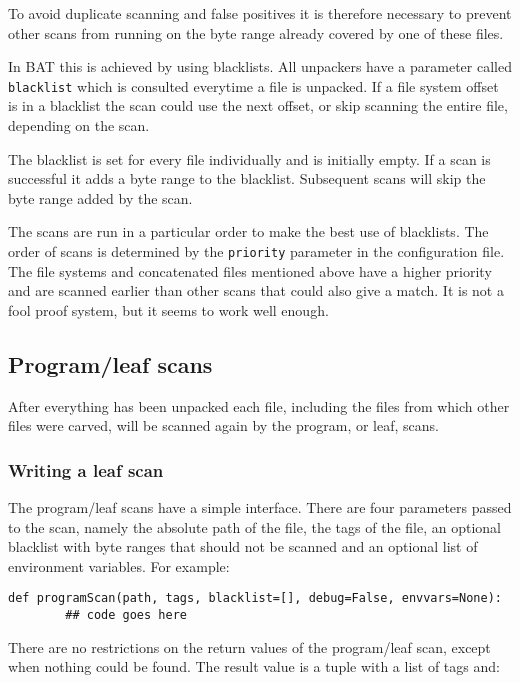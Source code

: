 \documentclass[10pt]{article}
\begin{document}
To avoid duplicate scanning and false positives it is therefore necessary to
prevent other scans from running on the byte range already covered by one of
these files.

In BAT this is achieved by using blacklists. All unpackers have a parameter
called \texttt{blacklist} which is consulted everytime a file is unpacked. If
a file system offset is in a blacklist the scan could use the next offset, or
skip scanning the entire file, depending on the scan.

The blacklist is set for every file individually and is initially empty. If a
scan is successful it adds a byte range to the blacklist. Subsequent scans
will skip the byte range added by the scan.

The scans are run in a particular order to make the best use of blacklists. The
order of scans is determined by the \texttt{priority} parameter in the
configuration file. The file systems and concatenated files mentioned above
have a higher priority and are scanned earlier than other scans that could also
give a match. It is not a fool proof system, but it seems to work well enough.

\subsection{Program/leaf scans}

After everything has been unpacked each file, including the files from which
other files were carved, will be scanned again by the program, or leaf, scans.

\subsubsection{Writing a leaf scan}

The program/leaf scans have a simple interface. There are four parameters
passed to the scan, namely the absolute path of the file, the tags of the file,
an optional blacklist with byte ranges that should not be scanned and an
optional list of environment variables. For example:

\begin{verbatim}
def programScan(path, tags, blacklist=[], debug=False, envvars=None):
        ## code goes here
\end{verbatim}

There are no restrictions on the return values of the program/leaf scan, except
when nothing could be found. The result value is a tuple with a list of tags
and:
\end{document}
